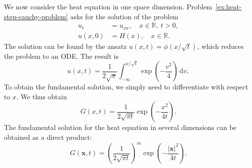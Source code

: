 We now consider the heat equation in one space dimension. Problem~\ref{ex:heat-step-cauchy-problem} asks for the solution of the problem
\begin{equation}\label{eq:heat-equation-heaviside-initial-problem}
\begin{aligned}
u_t&=u_{xx},\quad x\in\mathbb{R},\ t>0,\\
u(x,0)&=H(x),\quad x\in\mathbb{R}.
\end{aligned}
\end{equation}
The solution can be found by the ansatz $u(x,t)=\phi(x/\sqrt t)$, which reduces the problem to an ODE. The result is
\begin{equation}\label{eq:heat-heaviside-initial-solution}
u(x,t)=\dfrac1{2\sqrt\pi}\int_{-\infty}^{x/\sqrt t}\exp\left(-\dfrac{v^2}4\right)\,\mathrm{d}v,
\end{equation}
To obtain the fundamental solution, we simply need to differentiate with respect to $x$. We thus obtain
\begin{equation}\label{eq:heat-fundamental-solution-one-dimension}
G(x,t)=\dfrac1{2\sqrt{\pi t}}\exp\left(-\dfrac{x^2}{4t}\right).
\end{equation}
The fundamental solution for the heat equation in several dimensions can be obtained as a direct product:
\begin{equation}\label{eq:heat-fundamental-solution-multiple-dimensions}
G(\bm{x},t)=\left(\dfrac1{2\sqrt{\pi t}}\right)^m\exp\left(-\dfrac{|\bm{x}|^2}{4t}\right).
\end{equation}

